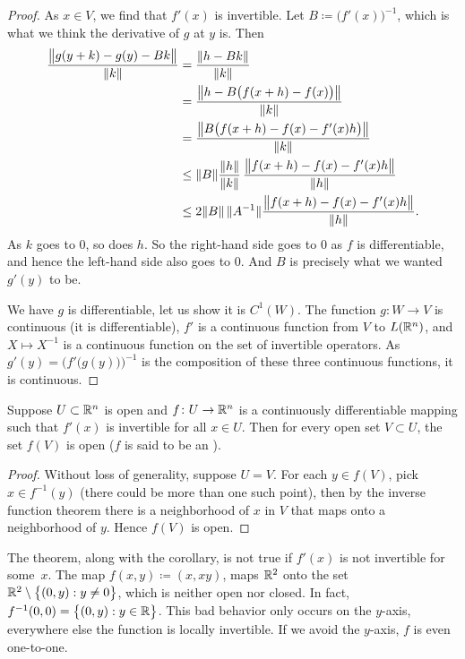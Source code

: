 \begin{proof}
As $x \in V$, we find that $f'(x)$ is invertible.
Let $B \coloneqq \bigl(f'(x)\bigr)^{-1}$, which is what we think the derivative of
$g$ at $y$ is.  Then
\begin{equation*}
\begin{split}
\frac{\bigl\lVert {g(y+k)-g(y)-Bk} \bigr\rVert}{\lVert {k} \rVert}
& =
\frac{\lVert {h-Bk} \rVert}{\lVert {k} \rVert}
\\
& =
\frac{\bigl\lVert {h-B\bigl(f(x+h)-f(x)\bigr)} \bigr\rVert}{\lVert {k} \rVert}
\\
& =
\frac{\bigl\lVert {B\bigl(f(x+h)-f(x)-f'(x)h\bigr)} \bigr\rVert}{\lVert {k} \rVert}
\\
& \leq
\lVert {B} \rVert
\frac{\lVert {h} \rVert}{\lVert {k} \rVert}\,
\frac{\bigl\lVert {f(x+h)-f(x)-f'(x)h} \bigr\rVert}{\lVert {h} \rVert}
\\
& \leq
2\lVert {B} \rVert \, \lVert {A^{-1}} \rVert
\frac{\bigl\lVert {f(x+h)-f(x)-f'(x)h} \bigr\rVert}{\lVert {h} \rVert} .
\end{split}
\end{equation*}
As $k$ goes to 0, so does $h$.  So the right-hand side goes to 0 as $f$ is
differentiable, and hence
the left-hand side also goes to 0.  And
$B$ is precisely what we wanted $g'(y)$ to be.

We have $g$ is differentiable, let us show it is $C^1(W)$.
The function $g \colon W \to V$ is continuous (it is differentiable),
$f'$ is a continuous function from $V$
to $L({\mathbb{R}}^n)$, and $X \mapsto X^{-1}$ is a continuous function on
the set of invertible operators.
As
$g'(y) = {\bigl( f'\bigl(g(y)\bigr)\bigr)}^{-1}$ is the composition
of these three
continuous functions, it is continuous.
\end{proof}

\begin{cor} \label{cor:IVTopenmap}
Suppose $U \subset {\mathbb{R}}^n$ is open and $f \colon U \to {\mathbb{R}}^n$ is a continuously
differentiable mapping such that $f'(x)$ is invertible for all $x \in U$.  Then
for every open set $V \subset U$, the set $f(V)$ is open ($f$ is said to be an
\emph{}).
\end{cor}

\begin{proof}
Without loss of generality, suppose $U=V$.
For each $y \in f(V)$, pick $x \in f^{-1}(y)$ (there could be more
than one such point), then by the inverse function theorem there is a
neighborhood of $x$ in $V$ that maps onto a neighborhood of $y$.  Hence
$f(V)$ is open.
\end{proof}

\begin{example}
The theorem, along with the corollary, is not true if $f'(x)$ is not invertible for
some~$x$.
The map $f(x,y) \coloneqq (x,xy)$, maps ${\mathbb{R}}^2$ onto the set
${\mathbb{R}}^2 \setminus \bigl\{ (0,y) : y \neq 0 \bigr\}$, which is neither open nor closed.
In fact, $f^{-1}(0,0) = \bigl\{ (0,y) : y \in {\mathbb{R}} \bigr\}$.  This bad behavior
only occurs on the $y$-axis, everywhere else the function is locally
invertible.  If we avoid the $y$-axis, $f$ is even one-to-one.
\end{example}


